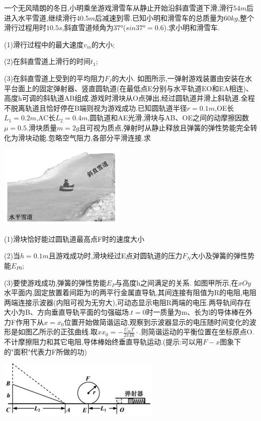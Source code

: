 \question[6] 一个无风晴朗的冬日,小明乘坐游戏滑雪车从静止开始沿斜直雪道下滑,滑行$54m$后进入水平雪道,继续滑行$40.5m$后减速到零.已知小明和滑雪车的总质量为$60kg$,整个滑行过程用时$10.5s$,斜直雪道倾角为$37°$($sin37°=0.6$).求小明和滑雪车.

(1)滑行过程中的最大速度$v_m$的大小;

(2)在斜直雪道上滑行的时间$t_1;$

(3)在斜直雪道上受到的平均阻力$F_f$的大小.
\question[6] 如图所示,一弹射游戏装置由安装在水平台面上的固定弹射器、竖直圆轨道(在最低点E分别与水平轨道EO和EA相连)、高度h可调的斜轨道AB组成.游戏时滑块从O点弹出,经过圆轨道并滑上斜轨道.全程不脱离轨道且恰好停在B端则视为游戏成功.已知圆轨道半径$r=0.1m$,OE长$L_1=0.2m$,AC长$L_2=0.4m$,圆轨道和AE光滑,滑块与AB、OE之间的动摩擦因数$μ=0.5.$滑块质量$m=2g$且可视为质点,弹射时从静止释放且弹簧的弹性势能完全转化为滑块动能.忽略空气阻力,各部分平滑连接.求\begin{center}\includegraphics[]{img/image17.png}\end{center}

(1)滑块恰好能过圆轨道最高点F时的速度大小

(2)当$h=0.1m$且游戏成功时,滑块经过E点对圆轨道的压力$F_N$大小及弹簧的弹性势能$E_{P0};$

(3)要使游戏成功,弹簧的弹性势能$E_P$与高度h之间满足的关系.
\question[6] 如图甲所示,在$xOy$水平面内,固定放置着间距为l的两平行金属直导轨,其间连接有阻值为R的电阻,电阻两端连接示波器(内阻可视为无穷大),可动态显示电阻R两端的电压.两导轨间存在大小为B、方向垂直导轨平面的匀强磁场$.t=0$时一质量为m、长为l的导体棒在外力F作用下从$x=x_0$位置开始做简谐运动,观察到示波器显示的电压随时间变化的波形是如图乙所示的正弦曲线.取$xx_{0}=-\frac{U_{m}T}{2\pi Bl}\cdot .$则简谐运动的平衡位置在坐标原点O.不计摩擦阻力和其它电阻,导体棒始终垂直导轨运动.(提示:可以用$F-x$图象下的"面积"代表力F所做的功)\begin{center}\includegraphics[]{img/image18.png}\end{center}

